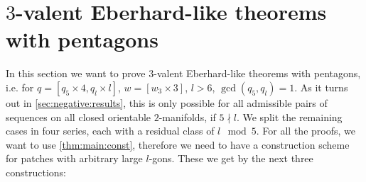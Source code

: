 \checkoddpage\ifoddpage\hbox{}\clearpage\else\fi%
\section{$3$-valent {\sc Eberhard}-like theorems with pentagons}\label{sec:5:3}

In this section we want to prove $3$-valent {\sc Eberhard}-like theorems with pentagons, i.e. for $q = [q_5 \times 4, q_l \times l]$, $w = [w_3 \times 3]$, $l > 6$, $\gcd(q_5, q_l) = 1$. As it turns out in \autoref{sec:negative:results}, this is only possible for all admissible pairs of sequences on all closed orientable $2$-manifolds, if $5 \nmid l$. We split the remaining cases in four series, each with a residual class of $l \mod 5$. For all the proofs, we want to use \autoref{thm:main:const}, therefore we need to have a construction scheme for patches with arbitrary large $l$-gons. These we get by the next three constructions:

